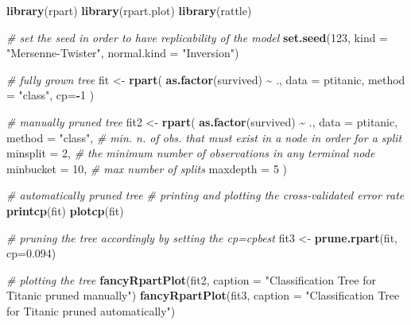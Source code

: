 \documentclass[
]{article}
\newenvironment{Shaded}{\begin{snugshade}}{\end{snugshade}}
\newcommand{\AttributeTok}[1]{\textcolor[rgb]{0.13,0.29,0.53}{#1}}
\newcommand{\CommentTok}[1]{\textcolor[rgb]{0.56,0.35,0.01}{\textit{#1}}}
\newcommand{\DecValTok}[1]{\textcolor[rgb]{0.00,0.00,0.81}{#1}}
\newcommand{\FloatTok}[1]{\textcolor[rgb]{0.00,0.00,0.81}{#1}}
\newcommand{\FunctionTok}[1]{\textcolor[rgb]{0.13,0.29,0.53}{\textbf{#1}}}
\newcommand{\NormalTok}[1]{#1}
\newcommand{\OtherTok}[1]{\textcolor[rgb]{0.56,0.35,0.01}{#1}}
\newcommand{\SpecialCharTok}[1]{\textcolor[rgb]{0.81,0.36,0.00}{\textbf{#1}}}
\newcommand{\StringTok}[1]{\textcolor[rgb]{0.31,0.60,0.02}{#1}}
\begin{document}
\begin{Shaded}
\begin{Highlighting}[]
\FunctionTok{library}\NormalTok{(rpart)}
\FunctionTok{library}\NormalTok{(rpart.plot)}
\FunctionTok{library}\NormalTok{(rattle)}

\CommentTok{\# set the seed in order to have replicability of the model}
\FunctionTok{set.seed}\NormalTok{(}\DecValTok{123}\NormalTok{, }\AttributeTok{kind =} \StringTok{"Mersenne{-}Twister"}\NormalTok{, }\AttributeTok{normal.kind =}  \StringTok{"Inversion"}\NormalTok{)}

\CommentTok{\# fully grown tree}
\NormalTok{fit }\OtherTok{\textless{}{-}} \FunctionTok{rpart}\NormalTok{(}
        \FunctionTok{as.factor}\NormalTok{(survived) }\SpecialCharTok{\textasciitilde{}}\NormalTok{ ., }
        \AttributeTok{data =}\NormalTok{ ptitanic, }
        \AttributeTok{method =} \StringTok{"class"}\NormalTok{,}
        \AttributeTok{cp=}\SpecialCharTok{{-}}\DecValTok{1}
\NormalTok{)}

\CommentTok{\# manually pruned tree}
\NormalTok{fit2 }\OtherTok{\textless{}{-}} \FunctionTok{rpart}\NormalTok{(}
        \FunctionTok{as.factor}\NormalTok{(survived) }\SpecialCharTok{\textasciitilde{}}\NormalTok{ ., }
        \AttributeTok{data =}\NormalTok{ ptitanic, }
        \AttributeTok{method =} \StringTok{"class"}\NormalTok{,}
        \CommentTok{\# min. n. of obs. that must exist in a node in order for a split }
        \AttributeTok{minsplit =} \DecValTok{2}\NormalTok{, }
        \CommentTok{\# the minimum number of observations in any terminal node}
        \AttributeTok{minbucket =} \DecValTok{10}\NormalTok{, }
        \CommentTok{\# max number of splits}
        \AttributeTok{maxdepth =} \DecValTok{5}
\NormalTok{)}

\CommentTok{\# automatically pruned tree}
\CommentTok{\# printing and plotting the cross{-}validated error rate}
\FunctionTok{printcp}\NormalTok{(fit)}
\FunctionTok{plotcp}\NormalTok{(fit)}

\CommentTok{\# pruning the tree accordingly by setting the cp=cpbest}
\NormalTok{fit3 }\OtherTok{\textless{}{-}} \FunctionTok{prune.rpart}\NormalTok{(fit, }\AttributeTok{cp=}\FloatTok{0.094}\NormalTok{)}

\CommentTok{\# plotting the tree}
\FunctionTok{fancyRpartPlot}\NormalTok{(fit2, }\AttributeTok{caption =} \StringTok{"Classification Tree for Titanic pruned manually"}\NormalTok{)}
\FunctionTok{fancyRpartPlot}\NormalTok{(fit3, }\AttributeTok{caption =} \StringTok{"Classification Tree for Titanic pruned automatically"}\NormalTok{)}
\end{Highlighting}
\end{Shaded}
\end{document}
